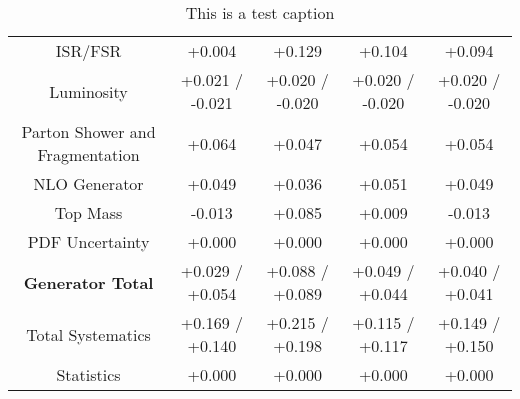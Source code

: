 \begin{table}[htbp]
\begin{center}
\begin{tabular}{|c|c|c|c|c|}
ISR/FSR                               &+0.004              & +0.129              & +0.104              & +0.094             \\
Luminosity                            &+0.021   / -0.021   & +0.020   / -0.020   & +0.020   / -0.020   & +0.020   / -0.020  \\
Parton Shower and Fragmentation       &+0.064              & +0.047              & +0.054              & +0.054             \\
NLO Generator                         &+0.049              & +0.036              & +0.051              & +0.049             \\
Top Mass                              &-0.013              & +0.085              & +0.009              & -0.013             \\
PDF Uncertainty                       &+0.000              & +0.000              & +0.000              & +0.000             \\
\hline
\textbf{Generator Total}              &+0.029   / +0.054   & +0.088   / +0.089   & +0.049   / +0.044   & +0.040   / +0.041  \\
\hline
\hline
Total Systematics                     &+0.169   / +0.140   & +0.215   / +0.198   & +0.115   / +0.117   & +0.149   / +0.150  \\
Statistics                            &+0.000              & +0.000              & +0.000              & +0.000             \\
\hline
  \end{tabular}
  \end{center} 
  \label{tab:xsec_nominal_deltaPhi_high}
  \caption{This is a test caption}
\end{table}
 

\clearpage


